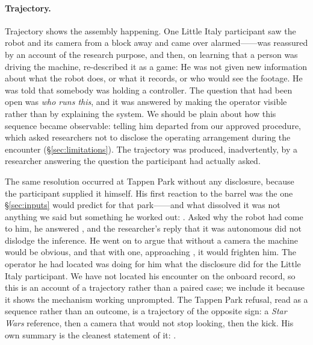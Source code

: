 \paragraph{Trajectory.}
Trajectory shows the assembly happening. One Little Italy participant saw the
robot and its camera from a block away and came over alarmed------was reassured by an account of the research purpose, and then, on
learning that a person was driving the machine, re-described it as a game:
 He was not given new information about
what the robot does, or what it records, or who would see the footage. He was
told that somebody was holding a controller. The question that had been open
was \emph{who runs this}, and it was answered by making the operator visible
rather than by explaining the system. We should be plain about how this
sequence became observable: telling him departed from our approved procedure,
which asked researchers not to disclose the operating arrangement during the
encounter (\S\ref{sec:limitations}). The trajectory was produced, inadvertently,
by a researcher answering the question the participant had actually asked.

The same resolution occurred at Tappen Park without any disclosure, because the
participant supplied it himself. His first reaction to the barrel was the one
\S\ref{sec:inputs} would predict for that park------and what dissolved it was not anything we said but
something he worked out: . Asked why the robot had come to
him, he answered , and the
researcher's reply that it was autonomous did not dislodge the inference. He
went on to argue that without a camera the machine would be obvious, and that
with one, approaching , it would frighten him. The
operator he had located was doing for him what the disclosure did for the
Little Italy participant. We have not located his encounter on the onboard
record, so this is an account of a trajectory rather than a paired case; we
include it because it shows the mechanism working unprompted. The Tappen Park
refusal, read as a sequence rather than an outcome, is a trajectory of the
opposite sign: a \emph{Star Wars} reference, then a camera that would not stop
looking, then the kick. His own summary is the cleanest statement of it:
.


